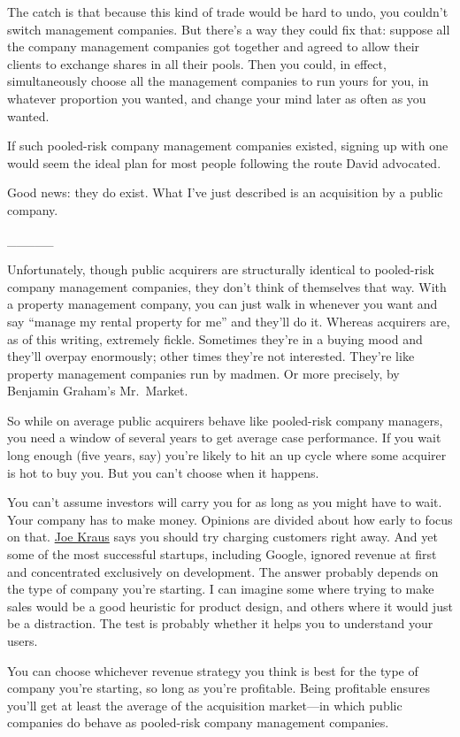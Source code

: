 \documentclass[12pt]{book}
\begin{document}
The catch is that because this kind of trade would be hard to undo, you
couldn't switch management companies. But there's a way they could fix
that: suppose all the company management companies got together and
agreed to allow their clients to exchange shares in all their pools.
Then you could, in effect, simultaneously choose all the management
companies to run yours for you, in whatever proportion you wanted, and
change your mind later as often as you wanted.

If such pooled-risk company management companies existed, signing up
with one would seem the ideal plan for most people following the route
David advocated.

Good news: they do exist. What I've just described is an acquisition by
a public company.

\_\_\_\_\_

Unfortunately, though public acquirers are structurally identical to
pooled-risk company management companies, they don't think of themselves
that way. With a property management company, you can just walk in
whenever you want and say ``manage my rental property for me'' and
they'll do it. Whereas acquirers are, as of this writing, extremely
fickle. Sometimes they're in a buying mood and they'll overpay
enormously; other times they're not interested. They're like property
management companies run by madmen. Or more precisely, by Benjamin
Graham's Mr.~Market.

So while on average public acquirers behave like pooled-risk company
managers, you need a window of several years to get average case
performance. If you wait long enough (five years, say) you're likely to
hit an up cycle where some acquirer is hot to buy you. But you can't
choose when it happens.

You can't assume investors will carry you for as long as you might have
to wait. Your company has to make money. Opinions are divided about how
early to focus on that.
\href{http://susanitsa.wordpress.com/2006/11/08/the-joe-kraus-qa-better-late/}{Joe
Kraus} says you should try charging customers right away. And yet some
of the most successful startups, including Google, ignored revenue at
first and concentrated exclusively on development. The answer probably
depends on the type of company you're starting. I can imagine some where
trying to make sales would be a good heuristic for product design, and
others where it would just be a distraction. The test is probably
whether it helps you to understand your users.

You can choose whichever revenue strategy you think is best for the type
of company you're starting, so long as you're profitable. Being
profitable ensures you'll get at least the average of the acquisition
market---in which public companies do behave as pooled-risk company
management companies.
\end{document}
